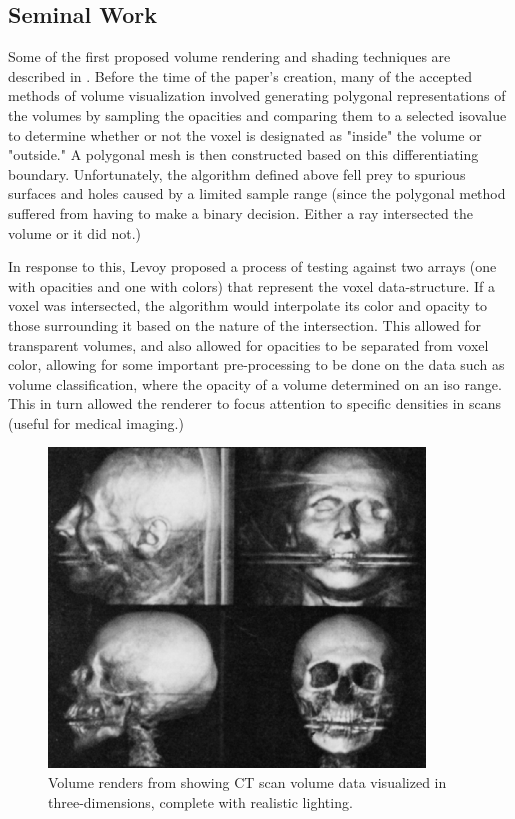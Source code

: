 \documentclass[12pt]{ucthesis}
\begin{document}
\subsection{Seminal Work}
Some of the first proposed volume rendering and shading techniques are described in \cite{levoy88}.  Before the time of the paper's creation, many of the accepted methods of volume visualization involved generating polygonal representations of the volumes by sampling the opacities and comparing them to a selected isovalue to determine whether or not the voxel is designated as "inside" the volume or "outside."  A polygonal mesh is then constructed based on this differentiating boundary.  Unfortunately, the algorithm defined above fell prey to spurious surfaces and holes caused by a limited sample range (since the polygonal method suffered from having to make a binary decision.  Either a ray intersected the volume or it did not.)

In response to this, Levoy proposed a process of testing against two arrays (one with opacities and one with colors) that represent the voxel data-structure.  If a voxel was intersected, the algorithm would interpolate its color and opacity to those surrounding it based on the nature of the intersection.  This allowed for transparent volumes, and also allowed for opacities to be separated from voxel color, allowing for some important pre-processing to be done on the data such as volume classification, where the opacity of a volume determined on an iso range.  This in turn allowed the renderer to focus attention to specific densities in scans (useful for medical imaging.)

\begin{figure}[h!]
    \centering
    \includegraphics[width=100mm]{img/external/img188.png}
    \caption{Volume renders from \cite{levoy88} showing CT scan volume data visualized in three-dimensions, complete with realistic lighting. }
    \label{fig:levoy}
\end{figure}
\end{document}
